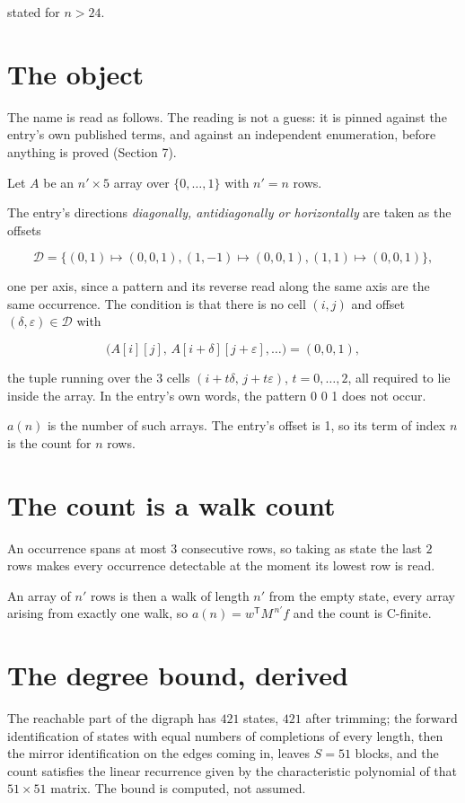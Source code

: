\documentclass[11pt]{article}
\theoremstyle{definition}
\begin{document}
stated for $n > 24$.

\section{The object}

The name is read as follows. The reading is not a guess: it is pinned against the entry's own published terms, and against an independent enumeration, before anything is proved (Section 7).

Let $A$ be an $n' \times 5$ array over $\{0,\dots,1\}$ with $n' = n$ rows.

The entry's directions {\itshape diagonally, antidiagonally or horizontally} are taken as the offsets

\[\mathcal{D} = \{(0,1)\mapsto(0,0,1), (1,-1)\mapsto(0,0,1), (1,1)\mapsto(0,0,1)\},\]

one per axis, since a pattern and its reverse read along the same axis are the same occurrence. The condition is that there is no cell $(i,j)$ and offset $(\delta,\varepsilon)\in\mathcal{D}$ with

\[\bigl(A[i][j],\,A[i{+}\delta][j{+}\varepsilon],\dots\bigr) = (0, 0, 1),\]

the tuple running over the $3$ cells $(i+t\delta,\,j+t\varepsilon)$, $t = 0,\dots,2$, all required to lie inside the array. In the entry's own words, the pattern 0 0 1 does not occur.

$a(n)$ is the number of such arrays. The entry's offset is 1, so its term of index $n$ is the count for $n$ rows.

\section{The count is a walk count}

An occurrence spans at most $3$ consecutive rows, so taking as state the last $2$ rows makes every occurrence detectable at the moment its lowest row is read.

An array of $n'$ rows is then a walk of length $n'$ from the empty state, every array arising from exactly one walk, so $a(n) = w^{\mathsf T}M^{\,n'}f$ and the count is C-finite.

\section{The degree bound, derived}

The reachable part of the digraph has $421$ states, $421$ after trimming; the forward identification of states with equal numbers of completions of every length, then the mirror identification on the edges coming in, leaves $S = 51$ blocks, and the count satisfies the linear recurrence given by the characteristic polynomial of that $51\times51$ matrix. The bound is computed, not assumed.
\end{document}
